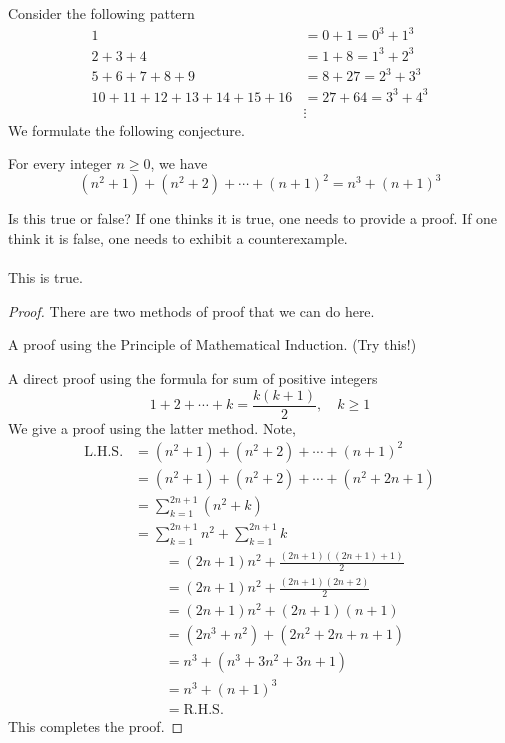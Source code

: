 \begin{example}
Consider the following pattern
\begin{align*}
1 &= 0 + 1 = 0^3 + 1^3\\[0.5em]
2 + 3 + 4 &= 1 + 8 = 1^3 + 2^3\\[0.5em]
5 + 6 + 7 + 8 + 9 &= 8 + 27 = 2^3 + 3^3\\[0.5em]
10 + 11 + 12 + 13 + 14 + 15 + 16 &= 27 + 64 = 3^3 + 4^3\\
 & \vdots
\end{align*}
We formulate the following conjecture.
\begin{conjecture}
For every integer $n \geq 0$, we have
\[(n^2 + 1) + (n^2 + 2) + \cdots + (n+1)^2 = n^3 + (n+1)^3\]
\end{conjecture}
Is this true or false? If one thinks it is true, one needs to provide a proof. If one think it is false, one needs to exhibit a counterexample.\\
\\
This is true.
\begin{proof}
There are two methods of proof that we can do here. 
\item[] A proof using the Principle of Mathematical Induction. (Try this!)
\item[] A direct proof using the formula for sum of positive integers
\[1 + 2 + \cdots + k = \frac{k(k+1)}{2},\quad k \geq 1\]
We give a proof using the latter method. Note,
\begin{align*}
\mathrm{L.H.S.} &= (n^2 + 1) + (n^2 + 2) + \cdots + (n+1)^2\\[0.5em]
 &= (n^2 + 1) + (n^2 + 2) + \cdots + (n^2+2n+1)\\[0.5em]
 &= \sum_{k=1}^{2n+1}(n^2 + k)\\[0.5em]
 &= \sum_{k=1}^{2n+1}n^2 + \sum_{k=1}^{2n+1}k
\end{align*}
\begin{align*}
\phantom{\mathrm{L.H.S.}} &= (2n+1)n^2 + \frac{(2n+1)((2n+1)+1)}{2}\\[0.5em]
 &= (2n+1)n^2 + \frac{(2n+1)(2n+2)}{2}\\[0.5em]
 &= (2n+1)n^2 + (2n + 1)(n+1)\\[0.5em]
 &= (2n^3 + n^2) +(2n^2 + 2n + n + 1)\\[0.5em]
 &= n^3 + (n^3 + 3n^2 + 3n + 1)\\[0.5em]
 &= n^3 + (n + 1)^3\\[0.5em]
 &= \mathrm{R.H.S.}
\end{align*}
This completes the proof.
\end{proof}
\end{example}

